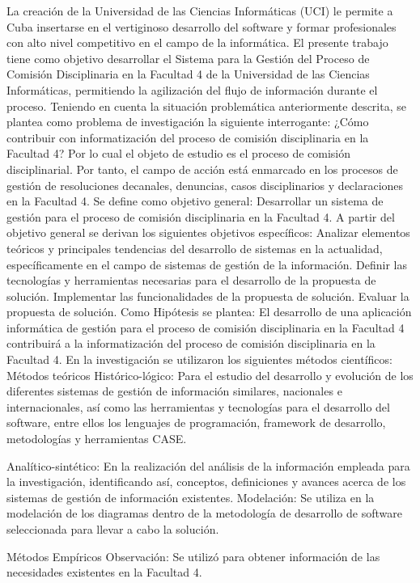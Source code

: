 \introduction
La creación de la Universidad de las Ciencias Informáticas (UCI) le permite a Cuba insertarse en el vertiginoso desarrollo del software y formar profesionales con alto nivel competitivo en el campo de la informática. 
El presente trabajo tiene como objetivo desarrollar el Sistema para la Gestión del Proceso de Comisión Disciplinaria en la Facultad 4 de la Universidad de las Ciencias Informáticas, permitiendo la agilización del flujo de información durante el proceso. 
Teniendo en cuenta la situación problemática anteriormente descrita, se plantea como problema de investigación la siguiente interrogante: 
¿Cómo contribuir con informatización del proceso de comisión disciplinaria en la Facultad 4? 
Por lo cual el objeto de estudio es el proceso de comisión disciplinarial. 
Por tanto, el campo de acción está enmarcado en los procesos de gestión de resoluciones decanales, denuncias, casos disciplinarios y declaraciones en la Facultad 4. 
Se define como objetivo general: Desarrollar un sistema de gestión para el proceso de comisión disciplinaria en la Facultad 4. 
A partir del objetivo general se derivan los siguientes objetivos específicos: 
Analizar elementos teóricos y principales tendencias del desarrollo de sistemas en la actualidad, específicamente en el campo de sistemas de gestión de la información.
Definir las tecnologías y herramientas necesarias para el desarrollo de la propuesta de solución. 
Implementar las funcionalidades de la propuesta de solución. 
Evaluar la propuesta de solución. 
Como Hipótesis se plantea: El desarrollo de una aplicación informática de gestión para el proceso de comisión disciplinaria en la Facultad 4 contribuirá a la informatización del proceso de comisión disciplinaria en la Facultad 4. 
En la investigación se utilizaron los siguientes métodos científicos:
Métodos teóricos 
Histórico-lógico: Para el estudio del desarrollo y evolución de los diferentes sistemas de gestión de 
información similares, nacionales e internacionales, así como las herramientas y tecnologías para el desarrollo del software, entre ellos los lenguajes de programación, framework de desarrollo, metodologías y herramientas CASE.

Analítico-sintético: En la realización del análisis de la información empleada para la investigación, identificando así, conceptos, definiciones y avances acerca de los sistemas de gestión de información existentes. 
Modelación: Se utiliza en la modelación de los diagramas dentro de la metodología de desarrollo de software seleccionada para llevar a cabo la solución. 

Métodos Empíricos 
Observación: Se utilizó para obtener información de las necesidades existentes en la Facultad 4. 